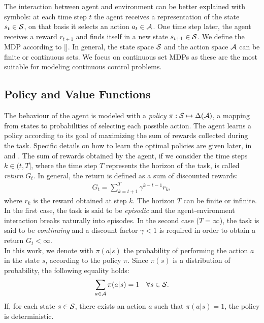 \newline
The interaction between agent and environment can be better explained with symbols: at each time step $t$ the agent receives a representation of the state $s_t \in \mathcal{S}$, on that basis it selects an action $a_t \in \mathcal{A}$. One time step later, the agent receives a reward $r_{t+1}$ and finds itself in a new state $s_{t+1} \in \mathcal{S}$. We define the \ac{MDP} according to [\cite{puterman2014markov}]. In general, the state space $\mathcal{S}$ and the action space $\mathcal{A}$ can be finite or continuous sets. We focus on continuous set \ac{MDPs} as these are the most suitable for modeling continuous control problems.
\subsection{Policy and Value Functions}
The behaviour of the agent is modeled with a \emph{policy} $\pi: \mathcal{S} \mapsto \Delta(\mathcal{A})$, \ie a mapping from states to probabilities of selecting each possible action. The agent learns a policy according to its goal of maximizing the sum of rewards collected during the task. Specific details on how to learn the optimal policies are given later, in  and . The sum of rewards obtained by the agent, if we consider the time steps $k \in (t, T]$, where the time step $T$ represents the horizon of the task, is called \emph{return} $G_t$. In general, the return is defined as a sum of discounted rewards:
\begin{align}G_t = \sum_{k=t+1}^{T} \gamma^{k-t-1} r_k, \end{align} where $r_k$ is the reward obtained at step $k$. The horizon $T$ can be finite or infinite. In the first case, the task is said to be \emph{episodic} and the agent-environment interaction breaks naturally into episodes. In the second case (\ie $T = \infty$), the task is said to be \emph{continuing} and a discount factor $\gamma<1$ is required in order to obtain a return $G_t < \infty$.\\
\newline
In this work, we denote with $\pi(a|s)$ the probability of performing the action $a$ in the state $s$, according to the policy $\pi$. Since $\pi(s)$ is a distribution of probability, the following equality holds:
\begin{align} \sum_{a \in \mathcal{A}} \pi(a|s) = 1 \quad \forall s \in \mathcal{S}. \end{align}
If, for each state $s \in \mathcal{S}$, there exists an action $a$ such that $\pi(a|s) = 1$, the policy is deterministic.\\
